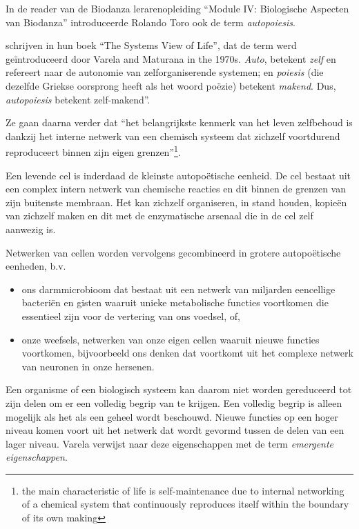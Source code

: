 \documentclass[
  11pt,
]{book}
\begin{document}
In de reader van de Biodanza lerarenopleiding ``Module IV: Biologische Aspecten van Biodanza'' introduceerde Rolando Toro ook de term \emph{autopoiesis}.

\citet{capraLuisi2014} schrijven in hun boek ``The Systems View of Life'', dat de term werd geïntroduceerd door Varela and Maturana in the 1970s. \emph{Auto}, betekent \emph{zelf} en refereert naar de autonomie van zelforganiserende systemen; en \emph{poiesis} (die dezelfde Griekse oorsprong heeft als het woord poëzie) betekent \emph{makend}. Dus, \emph{autopoiesis} betekent zelf-makend''.

Ze gaan daarna verder dat ``het belangrijkste kenmerk van het leven zelfbehoud is dankzij het interne netwerk van een chemisch systeem dat zichzelf voortdurend reproduceert binnen zijn eigen grenzen''\footnote{the main characteristic of life is self-maintenance due to internal networking of a chemical system that continuously reproduces itself within the boundary of its own making}.

Een levende cel is inderdaad de kleinste autopoëtische eenheid. De cel bestaat uit een complex intern netwerk van chemische reacties en dit binnen de grenzen van zijn buitenste membraan. Het kan zichzelf organiseren, in stand houden, kopieën van zichzelf maken en dit met de enzymatische arsenaal die in de cel zelf aanwezig is.

Netwerken van cellen worden vervolgens gecombineerd in grotere autopoëtische eenheden, b.v.

\begin{itemize}
\item
  ons darmmicrobioom dat bestaat uit een netwerk van miljarden eencellige bacteriën en gisten waaruit unieke metabolische functies voortkomen die essentieel zijn voor de vertering van ons voedsel, of,
\item
  onze weefsels, netwerken van onze eigen cellen waaruit nieuwe functies voortkomen, bijvoorbeeld ons denken dat voortkomt uit het complexe netwerk van neuronen in onze hersenen.
\end{itemize}

Een organisme of een biologisch systeem kan daarom niet worden gereduceerd tot zijn delen om er een volledig begrip van te krijgen. Een volledig begrip is alleen mogelijk als het als een geheel wordt beschouwd. Nieuwe functies op een hoger niveau komen voort uit het netwerk dat wordt gevormd tussen de delen van een lager niveau. Varela verwijst naar deze eigenschappen met de term \emph{emergente eigenschappen}.
\end{document}
